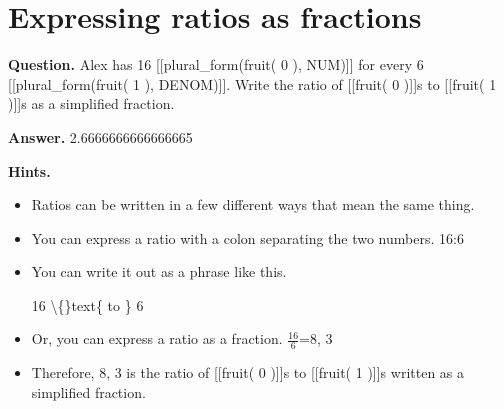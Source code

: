 \documentclass{article}
\begin{document}
\section*{Expressing ratios as fractions}
\textbf{Question.} Alex has 16 [[plural\_form(fruit( 0 ), NUM)]] for every  6 [[plural\_form(fruit( 1 ), DENOM)]].
                Write the ratio of [[fruit( 0 )]]s to [[fruit( 1 )]]s as a simplified fraction.

\textbf{Answer.} 2.6666666666666665

\textbf{Hints.}
\begin{itemize}
  \item Ratios can be written in a few different ways that mean the same thing.
  \item You can express a ratio with a colon separating the two numbers.
            16:6
  \item You can write it out as a phrase like this.
            
            16 \textbackslash\{\}text\{ to \} 6
  \item Or, you can express a ratio as a fraction.
            $\frac{16}{6}$=8, 3
  \item Therefore, 8, 3 is the ratio of [[fruit( 0 )]]s to [[fruit( 1 )]]s written as a simplified fraction.
\end{itemize}
\end{document}
